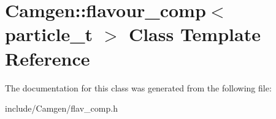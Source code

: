 \hypertarget{a00230}{}\section{Camgen\+:\+:flavour\+\_\+comp$<$ particle\+\_\+t $>$ Class Template Reference}
\label{a00230}


The documentation for this class was generated from the following file\+:\begin{DoxyCompactItemize}
\item 
include/\+Camgen/flav\+\_\+comp.\+h\end{DoxyCompactItemize}
